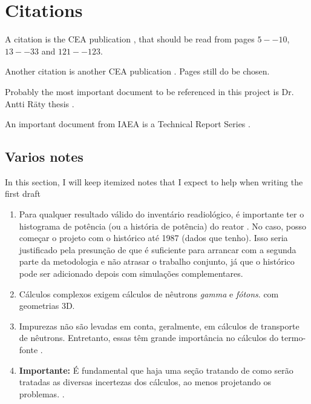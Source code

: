 \documentclass[11pt]{article} %
\begin{document}

\section{Citations}

A citation is the CEA publication \cite{Clean-up_CEA-e-DEN_2018}, that should be read from pages $5--10$, $13--33$ and $121--123$.

Another citation is another CEA publication \cite{Neutronics_CEA-e-DEN_2015}. Pages still do be chosen.

Probably the most important document to be referenced in this project is Dr. Antti R{\"a}ty thesis \cite{Raty_Thesis_2020}. 

An important document from IAEA is a Technical Report Series \cite{IAEA_TRS_494_2024}.

\subsection{Varios notes}

In this section, I will keep itemized notes that I expect to help when writing the first draft

\begin{enumerate}
\item Para qualquer resultado válido do inventário readiológico, é importante ter o histograma de potência (ou a história de potência) do reator \cite[p.~21]{Clean-up_CEA-e-DEN_2018}. No caso, posso começar o projeto com o histórico até 1987 (dados que tenho). Isso seria justificado pela presunção de que é suficiente para arrancar com a segunda parte da metodologia e não atrasar o trabalho conjunto, já que o histórico pode ser adicionado depois com simulações complementares.
\item Cálculos complexos exigem cálculos de nêutrons \textit{gamma} e \textit{fótons}.\cite[p.~22]{Clean-up_CEA-e-DEN_2018} com geometrias 3D.
\item Impurezas não são levadas em conta, geralmente, em cálculos de transporte de nêutrons. Entretanto, essas têm grande importância no cálculos do termo-fonte \cite[p.~24]{Clean-up_CEA-e-DEN_2018}.
  \item \textbf{Importante:} É fundamental que haja uma seção tratando de como serão tratadas as diversas incertezas dos cálculos, ao menos projetando os problemas. \cite[p.~165-170]{Neutronics_CEA-e-DEN_2015}.
\end{enumerate}


\end{document}
